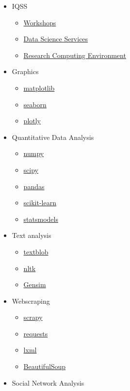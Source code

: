 \documentclass[]{book}
\providecommand{\tightlist}{%
  \setlength{\itemsep}{0pt}\setlength{\parskip}{0pt}}
\begin{document}
\begin{itemize}
\tightlist
\item
  IQSS

  \begin{itemize}
  \tightlist
  \item
    \href{https://dss.iq.harvard.edu/workshop-materials}{Workshops}
  \item
    \href{https://dss.iq.harvard.edu/}{Data Science Services}
  \item
    \href{https://iqss.github.io/dss-rce/}{Research Computing
    Environment}
  \end{itemize}
\item
  Graphics

  \begin{itemize}
  \tightlist
  \item
    \href{https://matplotlib.org/}{matplotlib}
  \item
    \href{https://seaborn.pydata.org/}{seaborn}
  \item
    \href{https://plot.ly/python/}{plotly}
  \end{itemize}
\item
  Quantitative Data Analysis

  \begin{itemize}
  \tightlist
  \item
    \href{http://www.numpy.org/}{numpy}
  \item
    \href{https://www.scipy.org/}{scipy}
  \item
    \href{https://pandas.pydata.org/}{pandas}
  \item
    \href{http://scikit-learn.org/stable/}{scikit-learn}
  \item
    \href{http://www.statsmodels.org/stable/}{statsmodels}
  \end{itemize}
\item
  Text analysis

  \begin{itemize}
  \tightlist
  \item
    \href{https://textblob.readthedocs.io/en/dev/}{textblob}
  \item
    \href{http://www.nltk.org/}{nltk}
  \item
    \href{https://radimrehurek.com/gensim/}{Gensim}
  \end{itemize}
\item
  Webscraping

  \begin{itemize}
  \tightlist
  \item
    \href{https://scrapy.org/}{scrapy}
  \item
    \href{http://docs.python-requests.org/en/master/}{requests}
  \item
    \href{https://lxml.de/}{lxml}
  \item
    \href{https://www.crummy.com/software/BeautifulSoup/}{BeautifulSoup}
  \end{itemize}
\item
  Social Network Analysis


\end{itemize}
\end{document}
